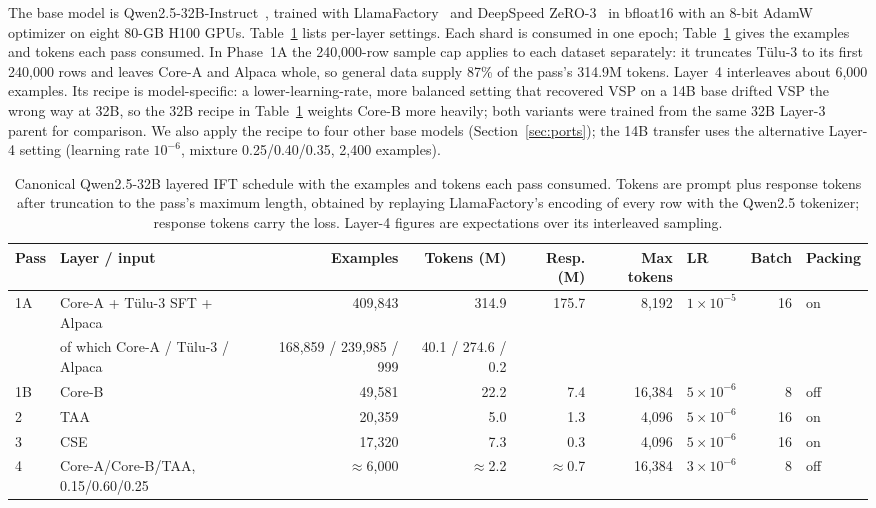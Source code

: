 \documentclass[conference]{IEEEtran}
\begin{document}
The base model is Qwen2.5-32B-Instruct~\cite{qwen25}, trained with LlamaFactory~\cite{zheng2024llamafactory} and DeepSpeed ZeRO-3~\cite{rajbhandari2020zero} in bfloat16 with an 8-bit AdamW optimizer on eight 80-GB H100 GPUs. Table~\ref{tab:train} lists per-layer settings. Each shard is consumed in one epoch; Table~\ref{tab:train} gives the examples and tokens each pass consumed. In Phase~1A the 240,000-row sample cap applies to each dataset separately: it truncates T\"ulu-3 to its first 240,000 rows and leaves Core-A and Alpaca whole, so general data supply 87\% of the pass's 314.9M tokens. Layer~4 interleaves about 6,000 examples. Its recipe is model-specific: a lower-learning-rate, more balanced setting that recovered VSP on a 14B base drifted VSP the wrong way at 32B, so the 32B recipe in Table~\ref{tab:train} weights Core-B more heavily; both variants were trained from the same 32B Layer-3 parent for comparison. We also apply the recipe to four other base models (Section~\ref{sec:ports}); the 14B transfer uses the alternative Layer-4 setting (learning rate $10^{-6}$, mixture 0.25/0.40/0.35, 2,400 examples).

\begin{table}[t]
\caption{Canonical Qwen2.5-32B layered IFT schedule with the examples and tokens each pass consumed. Tokens are prompt plus response tokens after truncation to the pass's maximum length, obtained by replaying LlamaFactory's encoding of every row with the Qwen2.5 tokenizer; response tokens carry the loss. Layer-4 figures are expectations over its interleaved sampling.}
\label{tab:train}
\centering
\footnotesize
\setlength{\tabcolsep}{3.0pt}
\begin{tabular}{@{}llrrrrlrl@{}}
\toprule
Pass & Layer / input & Examples & Tokens (M) & Resp. (M) & Max tokens & LR & Batch & Packing \\
\midrule
1A & Core-A + T\"ulu-3 SFT + Alpaca & 409,843 & 314.9 & 175.7 & 8,192 & $1\times10^{-5}$ & 16 & on \\
 & \quad of which Core-A / T\"ulu-3 / Alpaca & 168,859 / 239,985 / 999 & 40.1 / 274.6 / 0.2 & & & & & \\
1B & Core-B & 49,581 & 22.2 & 7.4 & 16,384 & $5\times10^{-6}$ & 8 & off \\
2 & TAA & 20,359 & 5.0 & 1.3 & 4,096 & $5\times10^{-6}$ & 16 & on \\
3 & CSE & 17,320 & 7.3 & 0.3 & 4,096 & $5\times10^{-6}$ & 16 & on \\
4 & Core-A/Core-B/TAA, 0.15/0.60/0.25 & $\approx$6,000 & $\approx$2.2 & $\approx$0.7 & 16,384 & $3\times10^{-6}$ & 8 & off \\
\bottomrule
\end{tabular}
\end{table}
\end{document}
